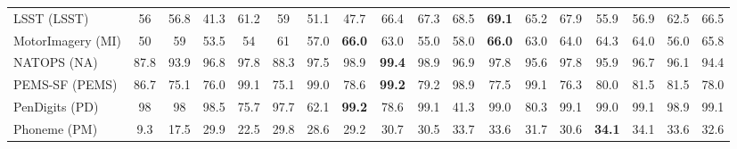 \documentclass[journal]{IEEEtran}
\begin{document}
\begin{table*}[!t]
\begin{tabular}{l|c|c|c|c|c|cccc|cccc|cccc|}
LSST (LSST) & 56    & 56.8  & 41.3  & 61.2  & 59    & \textcolor[rgb]{ 1,  0,  0}{51.1} & 47.7  & \textcolor[rgb]{ .188,  .329,  .588}{66.4} & \textcolor[rgb]{ .188,  .329,  .588}{67.3} & \textcolor[rgb]{ 1,  0,  0}{68.5} & \textcolor[rgb]{ .776,  .349,  .067}{\textbf{69.1}} & 65.2  & 67.9  & \textcolor[rgb]{ 1,  0,  0}{55.9} & \textcolor[rgb]{ .439,  .678,  .278}{56.9} & \textcolor[rgb]{ .439,  .678,  .278}{62.5} & \textcolor[rgb]{ .439,  .678,  .278}{66.5} \\
MotorImagery (MI) & 50    & 59    & 53.5  & 54    & 61    & \textcolor[rgb]{ 1,  0,  0}{57.0} & \textcolor[rgb]{ .188,  .329,  .588}{\textbf{66.0}} & \textcolor[rgb]{ .188,  .329,  .588}{63.0} & 55.0  & \textcolor[rgb]{ 1,  0,  0}{58.0} & \textcolor[rgb]{ .776,  .349,  .067}{\textbf{66.0}} & \textcolor[rgb]{ .776,  .349,  .067}{63.0} & \textcolor[rgb]{ .776,  .349,  .067}{64.0} & \textcolor[rgb]{ 1,  0,  0}{64.3} & 64.0  & 56.0  & \textcolor[rgb]{ .439,  .678,  .278}{65.8} \\
NATOPS (NA) & 87.8  & 93.9  & 96.8  & 97.8  & 88.3  & \textcolor[rgb]{ 1,  0,  0}{97.5} & \textcolor[rgb]{ .188,  .329,  .588}{98.9} & \textcolor[rgb]{ .188,  .329,  .588}{\textbf{99.4}} & \textcolor[rgb]{ .188,  .329,  .588}{98.9} & \textcolor[rgb]{ 1,  0,  0}{96.9} & \textcolor[rgb]{ .776,  .349,  .067}{97.8} & 95.6  & \textcolor[rgb]{ .776,  .349,  .067}{97.8} & \textcolor[rgb]{ 1,  0,  0}{95.9} & \textcolor[rgb]{ .439,  .678,  .278}{96.7} & \textcolor[rgb]{ .439,  .678,  .278}{96.1} & 94.4 \\
PEMS-SF (PEMS) & 86.7  & 75.1  & 76.0  & 99.1  & 75.1  & \textcolor[rgb]{ 1,  0,  0}{99.0} & 78.6  & \textcolor[rgb]{ .188,  .329,  .588}{\textbf{99.2}} & 79.2  & \textcolor[rgb]{ 1,  0,  0}{98.9} & 77.5  & \textcolor[rgb]{ .776,  .349,  .067}{99.1} & 76.3  & \textcolor[rgb]{ 1,  0,  0}{80.0} & \textcolor[rgb]{ .439,  .678,  .278}{81.5} & \textcolor[rgb]{ .439,  .678,  .278}{81.5} & 78.0 \\
PenDigits (PD) & 98    & 98    & 98.5  & 75.7  & 97.7  & \textcolor[rgb]{ 1,  0,  0}{62.1} & \textcolor[rgb]{ .188,  .329,  .588}{\textbf{99.2}} & \textcolor[rgb]{ .188,  .329,  .588}{78.6} & \textcolor[rgb]{ .188,  .329,  .588}{99.1} & \textcolor[rgb]{ 1,  0,  0}{41.3} & \textcolor[rgb]{ .776,  .349,  .067}{99.0} & \textcolor[rgb]{ .776,  .349,  .067}{80.3} & \textcolor[rgb]{ .776,  .349,  .067}{99.1} & \textcolor[rgb]{ 1,  0,  0}{99.0} & \textcolor[rgb]{ .439,  .678,  .278}{99.1} & 98.9  & \textcolor[rgb]{ .439,  .678,  .278}{99.1} \\
Phoneme (PM) & 9.3   & 17.5  & 29.9  & 22.5  & 29.8  & \textcolor[rgb]{ 1,  0,  0}{28.6} & \textcolor[rgb]{ .188,  .329,  .588}{29.2} & \textcolor[rgb]{ .188,  .329,  .588}{30.7} & \textcolor[rgb]{ .188,  .329,  .588}{30.5} & \textcolor[rgb]{ 1,  0,  0}{33.7} & 33.6  & 31.7  & 30.6  & \textcolor[rgb]{ 1,  0,  0}{\textbf{34.1}} & 34.1  & 33.6  & 32.6 \\

\end{tabular}
\end{table*}
\end{document}
